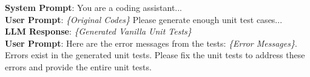 \begin{self_fix_prompt}
\scriptsize{
\textbf{System Prompt}: You are a coding assistant... \\
\textbf{User Prompt}: \textit{\{Original Codes\}} Please generate enough unit test cases... \\
\textbf{LLM Response}: \textit{\{Generated Vanilla Unit Tests\}}\\
\textbf{User Prompt}: Here are the error messages from the tests: \textit{\{Error Messages\}}. Errors exist in the generated unit tests. Please fix the unit tests to address these errors and provide the entire unit tests.
}
\end{self_fix_prompt}